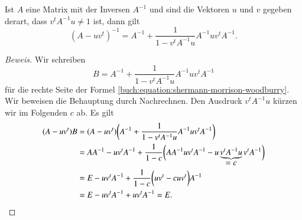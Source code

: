 \begin{satz}
\label{buch:satz:shermann}
Ist $A$ eine Matrix mit der Inversen $A^{-1}$ und sind die Vektoren
$u$ und $v$ gegeben derart, dass $v^tA^{-1}u\ne 1$ ist, dann gilt
\begin{equation}
(A-uv^t)^{-1}
=
A^{-1} + \frac{1}{1-v^tA^{-1}u} A^{-1}uv^tA^{-1}.
\label{buch:equation:shermann-morrison-woodburry}
\end{equation}
\end{satz}

\begin{proof}[Beweis]
Wir schreiben 
\[
B
=
A^{-1} + \frac{1}{1-v^tA^{-1}u} A^{-1}uv^tA^{-1}
\]
für die rechte Seite der
Formel \eqref{buch:equation:shermann-morrison-woodburry}.
Wir beweisen die Behauptung durch Nachrechnen.
Den Ausdruck $v^tA^{-1}u$ kürzen wir im Folgenden $c$ ab.
Es gilt
\begin{align*}
(A-uv^t)
B
&=
(A-uv^t)
\biggl(
A^{-1} + \frac{1}{1-v^tA^{-1}u} A^{-1}uv^tA^{-1}
\biggr)
\\
&=
AA^{-1}-uv^tA^{-1}
+
\frac{1}{1-c}
\biggl(
AA^{-1}uv^tA^{-1}
-u\underbrace{v^tA^{-1}u}_{\displaystyle=c}v^tA^{-1}
\biggr)
\\
&=
E-uv^tA^{-1}
+
\frac{1}{1-c}
\biggl(
uv^t
-cu v^t
\biggr)A^{-1}
\\
&=
E-uv^tA^{-1}
+
uv^t
A^{-1}
=
E.
\qedhere
\end{align*}
\end{proof}

